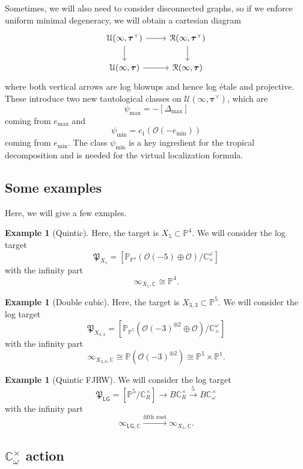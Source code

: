 \documentclass[10pt]{amsart}
\theoremstyle{definition}
\newtheorem{exm}[thm]{Example}
\theoremstyle{remark}
\theoremstyle{plain}
\theoremstyle{definition}
\theoremstyle{remark}
\newcommand{\C}{\mathbb{C}}
\renewcommand{\P}{\mathbb{P}}
\newcommand{\mc}[1]{\mathcal{#1}}
\newcommand{\mf}[1]{\mathfrak{#1}}
\newcommand{\btau}{\bm{\tau}}
\newcommand{\ms}[1]{\mathsf{#1}}
\newcommand{\1}{\mathbf{1}}
\newcommand{\2}{\mathbf{2}}
\newcommand{\3}{\mathbf{3}}
\newcommand{\LG}{\ms{LG}}
\begin{document}
Sometimes, we will also need to consider disconnected graphs, so if we enforce uniform minimal degeneracy, we will obtain a cartesian diagram
\begin{equation*}
\begin{tikzcd}
    \mc{U}(\infty, \btau^{\curlyvee}) \ar{r} \ar{d} & \mc{R}(\infty, \btau^{\curlyvee}) \ar{d} \\
    \mc{U}(\infty, \btau) \ar{r} & \mc{R}(\infty, \btau)  
\end{tikzcd}
\end{equation*}
where both vertical arrows are log blowups and hence log \'etale and projective. These introduce two new tautological classes on $\mc{U}(\infty, \btau^{\curlyvee})$, which are
\[ \psi_{\max} = -[\Delta_{\max}] \]
coming from $e_{\max}$ and
\[ \psi_{\min}= c_1(\mc{O}(-e_{\min})) \]
coming from $e_{\min}$. The class $\psi_{\min}$ is a key ingredient for the tropical decomposition and is needed for the virtual localization formula.

\subsection{Some examples}%
\label{sub:Some examples}

Here, we will give a few exmples.
\begin{exm}[Quintic]
    Here, the target is $X_5 \subset \P^4$. We will consider the log target
    \[ \mf{P}_{X_5} = [\P_{\P^4}(\mc{O}(-5) \oplus \mc{O})/\C_{\times}^{\omega}] \]
    with the infinity part
    \[ \infty_{X_5,\C} \cong \P^4. \]
\end{exm}

\begin{exm}[Double cubic]
    Here, the target is $X_{3,3} \subset \P^5$. We will consider the log target
    \[ \mf{P}_{X_{3,3}} = [\P_{\P^5}(\mc{O}(-3)^{\oplus 2} \oplus \mc{O})/\C_{\times}^{\omega}] \]
    with the infinity part
    \[ \infty_{X_{3,3},\C} \cong \P(\mc{O}(-3)^{\oplus 2}) \cong \P^5 \times \P^1. \]
\end{exm}

\begin{exm}[Quintic FJRW]
     We will consider the log target
    \[ \mf{P}_{\LG} = [\P^5 / \C_R^{\times}] \to B \C_R^{\times} \xrightarrow{5} B\C_{\omega}^{\times} \]
    with the infinity part
    \[ \infty_{\LG, \C} \xrightarrow{\text{fifth root}} \infty_{X_5, \C}. \]
\end{exm}

\subsection{$\C^{\times}_{\omega}$ action}%
\label{sub:action}
\end{document}
